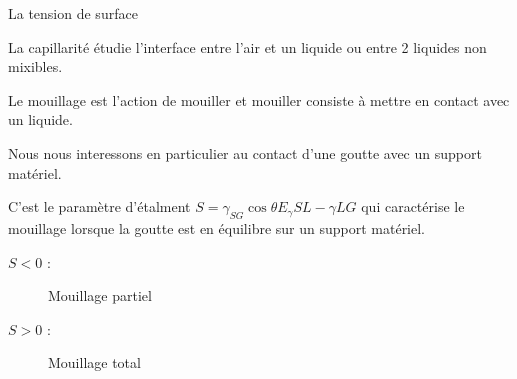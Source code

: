 
La tension de surface 

La capillarité étudie l'interface entre l'air et un liquide ou entre 2 liquides
non mixibles.

Le mouillage est l'action de mouiller et mouiller consiste à mettre en contact avec un liquide.

Nous nous interessons en particulier au contact d'une goutte avec un support matériel.

C'est le paramètre d'étalment $S = \gamma_{SG}\cos \theta{E} _ \gamma{SL} - \gamma{LG}$ qui caractérise le mouillage lorsque la goutte est en équilibre sur un support matériel.

\begin{description}
\item[$S < 0$ :] Mouillage partiel
\item[$S > 0$ :] Mouillage total
\end{description}



